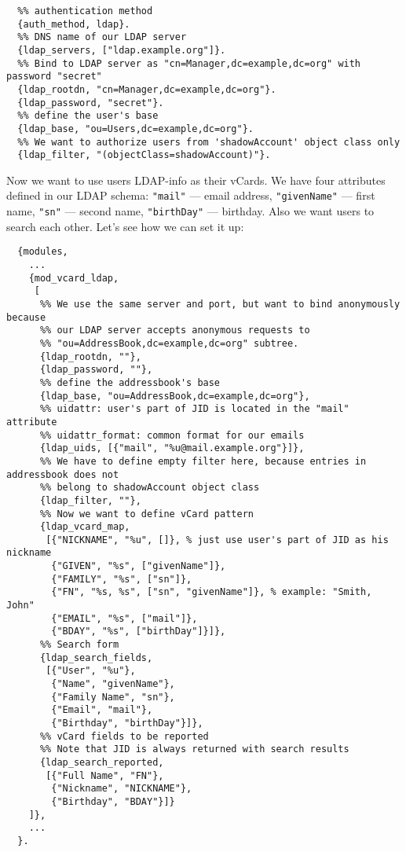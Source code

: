 \documentclass[a4paper,10pt]{book}
\newcommand{\term}[1]{\texttt{#1}}
\begin{document}
\begin{verbatim}
  %% authentication method
  {auth_method, ldap}.
  %% DNS name of our LDAP server
  {ldap_servers, ["ldap.example.org"]}.
  %% Bind to LDAP server as "cn=Manager,dc=example,dc=org" with password "secret"
  {ldap_rootdn, "cn=Manager,dc=example,dc=org"}.
  {ldap_password, "secret"}.
  %% define the user's base
  {ldap_base, "ou=Users,dc=example,dc=org"}.
  %% We want to authorize users from 'shadowAccount' object class only
  {ldap_filter, "(objectClass=shadowAccount)"}.
\end{verbatim}

Now we want to use users LDAP-info as their vCards.  We have four attributes
defined in our LDAP schema: \term{"mail"} --- email address, \term{"givenName"}
--- first name, \term{"sn"} --- second name, \term{"birthDay"} --- birthday.
Also we want users to search each other.  Let's see how we can set it up:

\begin{verbatim}
  {modules,
    ...
    {mod_vcard_ldap,
     [
      %% We use the same server and port, but want to bind anonymously because
      %% our LDAP server accepts anonymous requests to
      %% "ou=AddressBook,dc=example,dc=org" subtree.
      {ldap_rootdn, ""},
      {ldap_password, ""},
      %% define the addressbook's base
      {ldap_base, "ou=AddressBook,dc=example,dc=org"},
      %% uidattr: user's part of JID is located in the "mail" attribute
      %% uidattr_format: common format for our emails
      {ldap_uids, [{"mail", "%u@mail.example.org"}]},
      %% We have to define empty filter here, because entries in addressbook does not
      %% belong to shadowAccount object class
      {ldap_filter, ""},
      %% Now we want to define vCard pattern
      {ldap_vcard_map,
       [{"NICKNAME", "%u", []}, % just use user's part of JID as his nickname
        {"GIVEN", "%s", ["givenName"]},
        {"FAMILY", "%s", ["sn"]},
        {"FN", "%s, %s", ["sn", "givenName"]}, % example: "Smith, John"
        {"EMAIL", "%s", ["mail"]},
        {"BDAY", "%s", ["birthDay"]}]},
      %% Search form
      {ldap_search_fields,
       [{"User", "%u"},
        {"Name", "givenName"},
        {"Family Name", "sn"},
        {"Email", "mail"},
        {"Birthday", "birthDay"}]},
      %% vCard fields to be reported
      %% Note that JID is always returned with search results
      {ldap_search_reported,
       [{"Full Name", "FN"},
        {"Nickname", "NICKNAME"},
        {"Birthday", "BDAY"}]}
    ]},
    ...
  }.
\end{verbatim}
\end{document}
